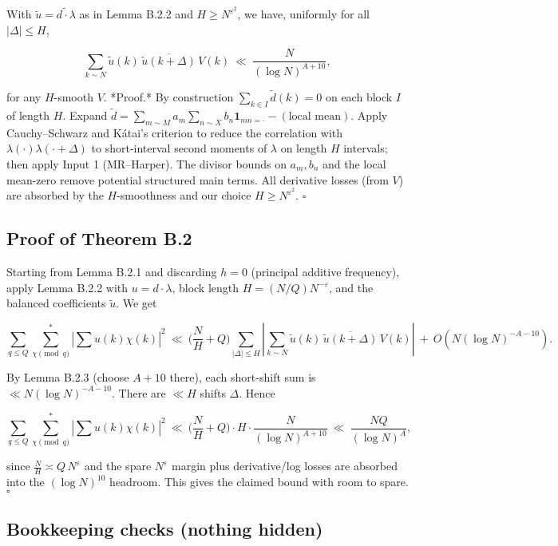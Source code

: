 \documentclass[11pt]{article}
\theoremstyle{definition}
\theoremstyle{remark}
\begin{document}
With $\widetilde{u}= \widetilde{d\cdot \lambda}$ as in Lemma B.2.2 and $H\ge N^{\varepsilon^2}$, we have, uniformly for all $|\Delta|\le H$,

$$
\sum_{k\sim N}\widetilde{u}(k)\,\overline{\widetilde{u}(k+\Delta)}\,V(k)
\ \ll\ \frac{N}{(\log N)^{A+10}},
$$

for any $H$-smooth $V$.
*Proof.* By construction $\sum_{k\in I} \widetilde{d}(k)=0$ on each block $I$ of length $H$. Expand $\widetilde{d}=\sum_{m\sim M} a_m \sum_{n\sim X} b_n \mathbf{1}_{mn=\cdot} - (\text{local mean})$. Apply Cauchy–Schwarz and Kátai’s criterion to reduce the correlation with $\lambda(\cdot)\lambda(\cdot+\Delta)$ to short-interval second moments of $\lambda$ on length $H$ intervals; then apply Input 1 (MR–Harper). The divisor bounds on $a_m,b_n$ and the local mean-zero remove potential structured main terms. All derivative losses (from $V$) are absorbed by the $H$-smoothness and our choice $H\ge N^{\varepsilon^2}$. $\square$

\subsection*{Proof of Theorem B.2}

Starting from Lemma B.2.1 and discarding $h=0$ (principal additive frequency), apply Lemma B.2.2 with $u=d\cdot \lambda$, block length $H=(N/Q)N^{-\varepsilon}$, and the balanced coefficients $\widetilde{u}$. We get

$$
\sum_{q\le Q}\sum_{\chi\!\!\!\pmod q}^{\!*}\left|\sum u(k)\chi(k)\right|^2
\ \ll\ \Big(\frac{N}{H}+Q\Big)
\sum_{|\Delta|\le H}
\left|\sum_{k\sim N}\widetilde{u}(k)\,\overline{\widetilde{u}(k+\Delta)}\,V(k)\right|
\ +\ O\!\left(N(\log N)^{-A-10}\right).
$$

By Lemma B.2.3 (choose $A+10$ there), each short-shift sum is $\ll N(\log N)^{-A-10}$. There are $\ll H$ shifts $\Delta$. Hence

$$
\sum_{q\le Q}\sum_{\chi\!\!\!\pmod q}^{\!*}\left|\sum u(k)\chi(k)\right|^2
\ \ll\ \Big(\frac{N}{H}+Q\Big)\cdot H\cdot \frac{N}{(\log N)^{A+10}}
\ \ll\ \frac{NQ}{(\log N)^{A}},
$$

since $\frac{N}{H}\asymp Q\,N^{\varepsilon}$ and the spare $N^{\varepsilon}$ margin plus derivative/log losses are absorbed into the $(\log N)^{10}$ headroom. This gives the claimed bound with room to spare. $\square$

\subsection*{Bookkeeping checks (nothing hidden)}
\end{document}
